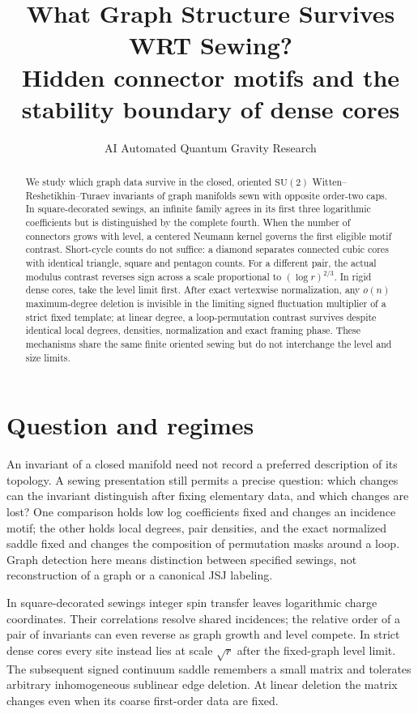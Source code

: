 \documentclass[11pt]{article}
\title{What Graph Structure Survives WRT Sewing?\\
\large Hidden connector motifs and the stability boundary of dense cores}
\author{AI Automated Quantum Gravity Research}
\date{}
\theoremstyle{definition}
\begin{document}
\maketitle
\begin{abstract}
We study which graph data survive in the closed, oriented \(\mathrm{SU}(2)\) Witten--Reshetikhin--Turaev invariants of graph manifolds sewn with opposite order-two caps. In square-decorated sewings, an infinite family agrees in its first three logarithmic coefficients but is distinguished by the complete fourth. When the number of connectors grows with level, a centered Neumann kernel governs the first eligible motif contrast. Short-cycle counts do not suffice: a diamond separates connected cubic cores with identical triangle, square and pentagon counts. For a different pair, the actual modulus contrast reverses sign across a scale proportional to \((\log r)^{2/3}\). In rigid dense cores, take the level limit first. After exact vertexwise normalization, any \(o(n)\) maximum-degree deletion is invisible in the limiting signed fluctuation multiplier of a strict fixed template; at linear degree, a loop-permutation contrast survives despite identical local degrees, densities, normalization and exact framing phase. These mechanisms share the same finite oriented sewing but do not interchange the level and size limits.
\end{abstract}
\tableofcontents

\section{Question and regimes}
An invariant of a closed manifold need not record a preferred description of its topology. A sewing presentation still permits a precise question: which changes can the invariant distinguish after fixing elementary data, and which changes are lost? One comparison holds low log coefficients fixed and changes an incidence motif; the other holds local degrees, pair densities, and the exact normalized saddle fixed and changes the composition of permutation masks around a loop. Graph detection here means distinction between specified sewings, not reconstruction of a graph or a canonical JSJ labeling.

In square-decorated sewings integer spin transfer leaves logarithmic charge coordinates. Their correlations resolve shared incidences; the relative order of a pair of invariants can even reverse as graph growth and level compete. In strict dense cores every site instead lies at scale \(\sqrt r\) after the fixed-graph level limit. The subsequent signed continuum saddle remembers a small matrix and tolerates arbitrary inhomogeneous sublinear edge deletion. At linear deletion the matrix changes even when its coarse first-order data are fixed.
\end{document}
